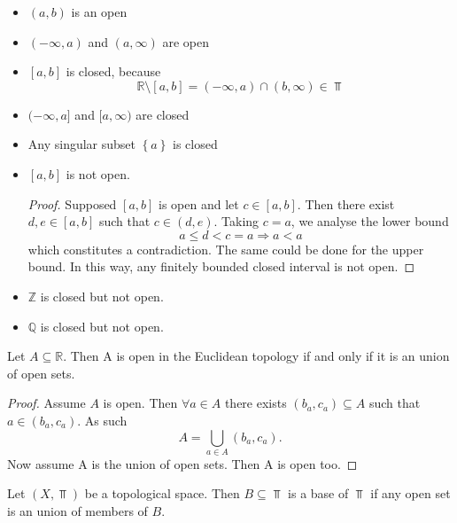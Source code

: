 \documentclass[../../main/main.tex]{subfiles}
\begin{document}
\begin{itemize}
  \item $\left( a, b \right)$ is an open
  \item $\left( -\infty, a \right) $  and $\left( a, \infty \right) $ are open
  \item $\left[ a, b \right] $ is closed, because
    \begin{equation*}
      \mathbb{R} \setminus \left[ a, b \right] = \left( -\infty, a \right) \cap \left( b, \infty \right)  \in \Top
    \end{equation*}
  \item $ ( - \infty, a ]$ and $[a, \infty)$ are closed
  \item Any singular subset $\left\{ a \right\} $ is closed
  \item $ \left[ a, b \right] $ is not open.
    \begin{proof}
      Supposed $\left[ a, b \right] $ is open and let $c \in [a, b]$. Then there exist $d, e \in [a, b]$ such that $c \in (d, e)$. Taking $c = a$, we analyse the lower bound
      \begin{equation*}
        a \leq  d < c =a \Longrightarrow a < a
      \end{equation*}
      which constitutes a contradiction. The same could be done for the upper bound. In this way, any finitely bounded closed interval is not open.
    \end{proof}
  \item $\mathbb{Z}$ is closed but not open.
  \item $\mathbb{Q}$ is closed but not open.
\end{itemize}

\begin{theorem}
  Let $A \subseteq \mathbb{R}$. Then A is open in the Euclidean topology if and only if it is an union of open sets.
\end{theorem}
\begin{proof}
  Assume $A$ is open. Then $\forall a \in A$ there exists $(b_{a}, c_{a}) \subseteq A$ such that $a \in (b_{a}, c_{a})$. As such
  \begin{equation*}
    A = \bigcup_{a \in A} (b_{a}, c_{a}).
  \end{equation*}
  Now assume A is the union of open sets. Then A is open too.
\end{proof}

\begin{definition}
  Let $(X, \Top)$ be a topological space. Then $B \subseteq \Top$ is a base of $\Top$ if any open set is an union of members of $B$.
\end{definition}
\end{document}
